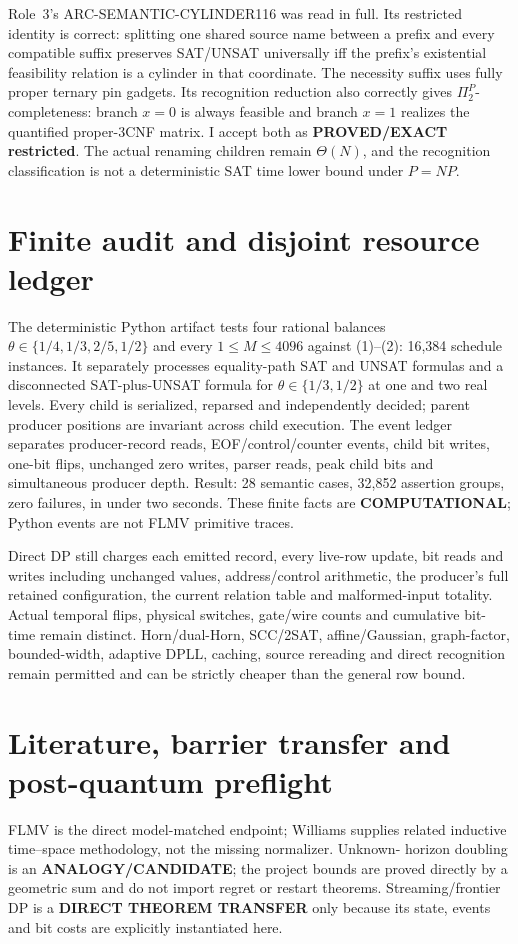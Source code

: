 \documentclass[11pt]{article}
\begin{document}
Role~3's ARC-SEMANTIC-CYLINDER116 was read in full.  Its restricted identity
is correct: splitting one shared source name between a prefix and every
compatible suffix preserves SAT/UNSAT universally iff the prefix's
existential feasibility relation is a cylinder in that coordinate.  The
necessity suffix uses fully proper ternary pin gadgets.  Its recognition
reduction also correctly gives $\Pi_2^P$-completeness: branch $x=0$ is always
feasible and branch $x=1$ realizes the quantified proper-3CNF matrix.  I
accept both as \textbf{PROVED/EXACT restricted}.  The actual renaming children
remain $\Theta(N)$, and the recognition classification is not a deterministic
SAT time lower bound under $P=NP$.

\section{Finite audit and disjoint resource ledger}
The deterministic Python artifact tests four rational balances
$\theta\in\{1/4,1/3,2/5,1/2\}$ and every $1\le M\le4096$ against (1)--(2):
16,384 schedule instances.  It separately processes equality-path SAT and
UNSAT formulas and a disconnected SAT-plus-UNSAT formula for
$\theta\in\{1/3,1/2\}$ at one and two real levels.  Every child is serialized,
reparsed and independently decided; parent producer positions are invariant
across child execution.  The event ledger separates producer-record reads,
EOF/control/counter events, child bit writes, one-bit flips, unchanged zero
writes, parser reads, peak child bits and simultaneous producer depth.
Result: 28 semantic cases, 32,852 assertion groups, zero failures, in under
two seconds.  These finite facts are \textbf{COMPUTATIONAL}; Python events
are not FLMV primitive traces.

Direct DP still charges each emitted record, every live-row update, bit reads
and writes including unchanged values, address/control arithmetic, the
producer's full retained configuration, the current relation table and
malformed-input totality.  Actual temporal flips, physical switches,
gate/wire counts and cumulative bit-time remain distinct.  Horn/dual-Horn,
SCC/2SAT, affine/Gaussian, graph-factor, bounded-width, adaptive DPLL,
caching, source rereading and direct recognition remain permitted and can be
strictly cheaper than the general row bound.

\section{Literature, barrier transfer and post-quantum preflight}
FLMV is the direct model-matched endpoint; Williams supplies related
inductive time--space methodology, not the missing normalizer.  Unknown-
horizon doubling is an \textbf{ANALOGY/CANDIDATE}; the project bounds are
proved directly by a geometric sum and do not import regret or restart
theorems.  Streaming/frontier DP is a \textbf{DIRECT THEOREM TRANSFER} only
because its state, events and bit costs are explicitly instantiated here.
\end{document}
